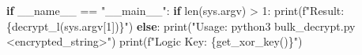 \documentclass[
]{article}
\newenvironment{Shaded}{}{}
\newcommand{\BuiltInTok}[1]{\textcolor[rgb]{0.00,0.50,0.00}{#1}}
\newcommand{\ControlFlowTok}[1]{\textcolor[rgb]{0.00,0.44,0.13}{\textbf{#1}}}
\newcommand{\DecValTok}[1]{\textcolor[rgb]{0.25,0.63,0.44}{#1}}
\newcommand{\NormalTok}[1]{#1}
\newcommand{\OperatorTok}[1]{\textcolor[rgb]{0.40,0.40,0.40}{#1}}
\newcommand{\SpecialCharTok}[1]{\textcolor[rgb]{0.25,0.44,0.63}{#1}}
\newcommand{\SpecialStringTok}[1]{\textcolor[rgb]{0.73,0.40,0.53}{#1}}
\newcommand{\StringTok}[1]{\textcolor[rgb]{0.25,0.44,0.63}{#1}}
\newcommand{\VariableTok}[1]{\textcolor[rgb]{0.10,0.09,0.49}{#1}}
\begin{document}
\begin{Shaded}
\begin{Highlighting}[]
\ControlFlowTok{if} \VariableTok{\_\_name\_\_} \OperatorTok{==} \StringTok{"\_\_main\_\_"}\NormalTok{:}
    \ControlFlowTok{if} \BuiltInTok{len}\NormalTok{(sys.argv) }\OperatorTok{\textgreater{}} \DecValTok{1}\NormalTok{:}
        \BuiltInTok{print}\NormalTok{(}\SpecialStringTok{f"Result: }\SpecialCharTok{\{}\NormalTok{decrypt\_l(sys.argv[}\DecValTok{1}\NormalTok{])}\SpecialCharTok{\}}\SpecialStringTok{"}\NormalTok{)}
    \ControlFlowTok{else}\NormalTok{:}
        \BuiltInTok{print}\NormalTok{(}\StringTok{"Usage: python3 bulk\_decrypt.py \textless{}encrypted\_string\textgreater{}"}\NormalTok{)}
        \BuiltInTok{print}\NormalTok{(}\SpecialStringTok{f"Logic Key: }\SpecialCharTok{\{}\NormalTok{get\_xor\_key()}\SpecialCharTok{\}}\SpecialStringTok{"}\NormalTok{)}
\end{Highlighting}
\end{Shaded}
\end{document}
